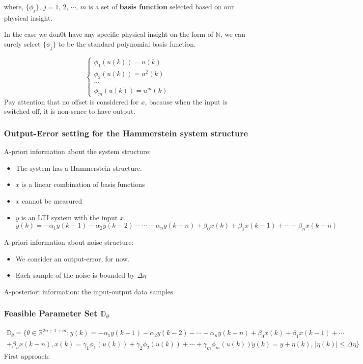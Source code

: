 where, $\{\phi_j\},\,j = 1,\,2,\,\cdots,\,m$ is a set of \textbf{basis function} selected based on our physical insight.

In the case we don0t have any specific physical insight on the form of $\mathbb{N}$, we can surely select $\{\phi_j\}$ to be the standard polynomial basis function.

\[
\begin{cases}
\phi_1(u(k)) = u(k)\\
\phi_2(u(k)) = u^2(k)\\
\cdots\\
\phi_m(u(k)) = u^m(k)
\end{cases}
\]
Pay attention that no offset is considered for $x$, bacause when the input is switched off, it is non-sence to have output.\\

\subsubsection{Output-Error setting for the Hammerstein system structure}
A-priori information about the system structure:
\begin{itemize}
    \item The system has a Hammerstein structure.
    \item $x$ is a linear combination of basis functions
    \item $x$ cannot be measured
    \item $y$ is an LTI system with the input $x$.\\
    \[
    y(k) = -\alpha_1y(k-1) - \alpha_2y(k-2) - \cdots - \alpha_n y(k-n) + \beta_0 x(k) + \beta_1 x(k-1) + \cdots + \beta_n x(k-n)
    \]
\end{itemize}

A-priori information about noise structure:
\begin{itemize}
    \item We consider an output-error, for now.
    \item Each sample of the noise is bounded by $\Delta \eta$
\end{itemize}

A-posteriori information: the input-output data samples.

\subsubsection{Feasible Parameter Set $\mathbb{D}_\theta$}
\[
\begin{array}{l}
\mathbb{D}_\theta = \{\theta \in \mathbb{R}^{2n + 1 + m}: 
    y(k) = -\alpha_1y(k-1) - \alpha_2y(k-2) - \cdots - \alpha_n y(k-n) + \beta_0 x(k) + \beta_1 x(k-1) + \cdots \\+ \beta_n x(k-n), x(k) = \gamma_1\phi_1(u(k)) + \gamma_2\phi_2(u(k)) + \cdots + \gamma_m\phi_m(u(k))
\tilde{y}(k) = y + \eta(k),\,|\eta(k)|\leq \Delta\eta
\}
\end{array}
\]
First approach:

